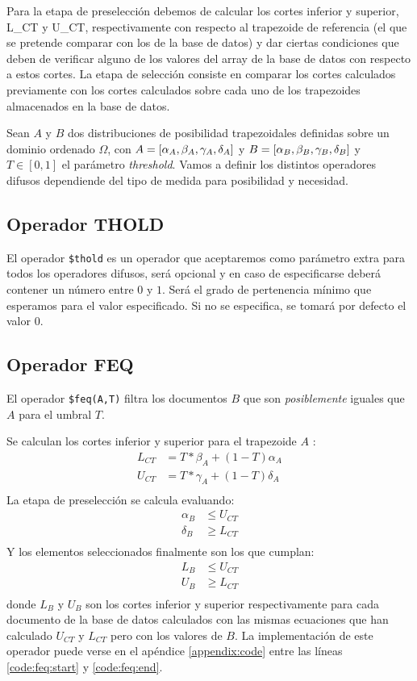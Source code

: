 Para la etapa de preselección debemos de calcular los cortes inferior y superior, L\_CT y U\_CT, respectivamente con respecto al trapezoide de referencia (el que se pretende comparar con los de la base de datos) y dar ciertas condiciones que deben de verificar alguno de los valores del array de la base de datos con respecto a estos cortes. La etapa de selección consiste en comparar los cortes calculados previamente con los cortes calculados sobre cada uno de los trapezoides almacenados en la base de datos. 

Sean $A$ y $B$ dos distribuciones de posibilidad trapezoidales definidas sobre un dominio ordenado $\Omega$, con $A = [\alpha_A, \beta_A, \gamma_A, \delta_A]$ y $B=[\alpha_B, \beta_B, \gamma_B, \delta_B]$ y $T \in [0,1]$ el parámetro \textit{threshold}. Vamos a definir los distintos operadores difusos dependiende del tipo de medida para posibilidad y necesidad.

\subsection{Operador THOLD}

El operador \texttt{\$thold} es un operador que aceptaremos como parámetro extra para todos los operadores difusos, será opcional y en caso de especificarse deberá contener un número entre $0$ y $1$. Será el grado de pertenencia mínimo que esperamos para el valor especificado. Si no se especifica, se tomará por defecto el valor $0$.

\subsection{Operador FEQ}

El operador \texttt{\$feq(A,T)} filtra los documentos $B$ que son \textit{posiblemente} iguales que $A$ para el umbral $T$.

Se calculan los cortes inferior y superior para el trapezoide $A$ \cite{indexingstrategies}:
%
\begin{align*}
    L_{CT} &= T * \beta_A + (1-T)\alpha_A \\
    U_{CT} &= T * \gamma_A + (1-T)\delta_A \\
\end{align*}
%
La etapa de preselección se calcula evaluando:
%
\begin{align*}
    \alpha_B &\leq U_{CT} \\
    \delta_B &\geq L_{CT} \\
\end{align*}
%
Y los elementos seleccionados finalmente son los que cumplan:
%
\begin{align*}
    L_B &\leq U_{CT} \\
    U_B &\geq L_{CT} \\
\end{align*}
%
donde $L_B$ y $U_B$ son los cortes inferior y superior respectivamente para cada documento de la base de datos calculados con las mismas ecuaciones que han calculado $U_{CT}$ y $L_{CT}$ pero con los valores de $B$.
La implementación de este operador puede verse en el apéndice \ref{appendix:code} entre las líneas \ref{code:feq:start} y \ref{code:feq:end}.

